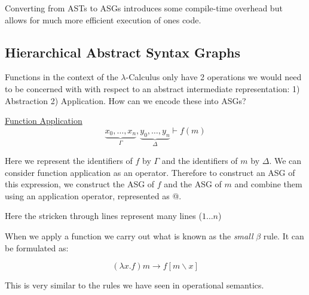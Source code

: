 \documentclass{article}
\renewcommand{\i}[1]{\textit{#1}}
\renewcommand{\u}[1]{\underline{#1}}
\begin{document}
Converting from ASTs to ASGs introduces some compile-time overhead but allows for much more efficient execution of ones code. 

\subsection{Hierarchical Abstract Syntax Graphs}

Functions in the context of the $\lambda$-Calculus only have 2 operations we would need to be concerned with with respect to an abstract intermediate representation: 1) Abstraction 2) Application. How can we encode these into ASGs?

\u{Function Application}
\[
    \underbrace{x_0,\dots,x_n}_\Gamma,\underbrace{y_0,\dots,y_n}_\Delta \vdash f(m)
\]

Here we represent the identifiers of $f$ by $\Gamma$ and the identifiers of $m$ by $\Delta$.
We can consider function application as an operator. Therefore to construct an ASG of this expression, we construct the ASG of $f$ and the ASG of $m$ and combine them using an application operator, represented as @.

\begin{center}
\end{center}

Here the stricken through lines represent many lines ($1\ldots n$)

When we apply a function we carry out what is known as the \i{small} $\beta$ rule. It can be formulated as:

\[
    ( \lambda x.f)m \rightarrow f[m\backslash x]
\]

This is very similar to the rules we have seen in operational semantics.
\end{document}
